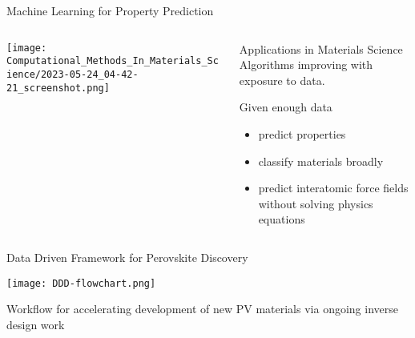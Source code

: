 \documentclass[10pt, aspectratio=169, presentation]{beamer}
\begin{document}
\begin{frame}[label={sec:org91eade9}]{Machine Learning for Property Prediction}
\begin{columns}
\begin{column}{0.7\columnwidth}
\begin{center}
\texttt{[image: Computational\_Methods\_In\_Materials\_Science/2023-05-24\_04-42-21\_screenshot.png]}
\end{center}
\end{column}

\begin{column}{0.3\columnwidth}
\begin{block}{Applications in Materials Science}
Algorithms improving with exposure to data.
\autocite{pablo-2019-new-front}

Given enough data
\begin{itemize}
\item predict properties
\item classify materials broadly
\item predict interatomic force fields without solving physics equations
\end{itemize}
\end{block}
\end{column}
\end{columns}
\end{frame}

\begin{frame}[label={sec:org7c180a5}]{Data Driven Framework for Perovskite Discovery}
\begin{center}
\texttt{[image: DDD-flowchart.png]}
\end{center}
\center{}\vspace{-0.75cm}Workflow for accelerating development of new PV materials
\autocite{yang-2023-high-throug}
via ongoing inverse design work
\autocite{yang-2023-discov-novel}
\end{frame}
\end{document}
